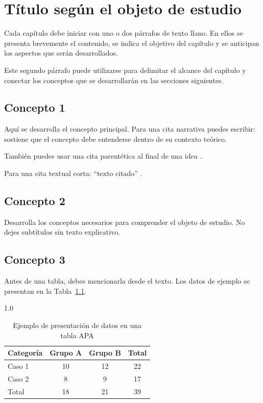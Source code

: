 \chapter{Título según el objeto de estudio}

Cada capítulo debe iniciar con uno o dos párrafos de texto llano. En ellos se presenta brevemente el contenido, se indica el objetivo del capítulo y se anticipan los aspectos que serán desarrollados.

Este segundo párrafo puede utilizarse para delimitar el alcance del capítulo y conectar los conceptos que se desarrollarán en las secciones siguientes.

\section{Concepto 1}

Aquí se desarrolla el concepto principal. Para una cita narrativa puedes escribir: \textcite{ejemplo2020} sostiene que el concepto debe entenderse dentro de su contexto teórico.

También puedes usar una cita parentética al final de una idea \parencite{ejemplo2020}.

Para una cita textual corta: ``texto citado'' \parencite[87]{ejemplo2020}.

\section{Concepto 2}

Desarrolla los conceptos necesarios para comprender el objeto de estudio. No dejes subtítulos sin texto explicativo.

\section{Concepto 3}

Antes de una tabla, debes mencionarla desde el texto. Los datos de ejemplo se presentan en la Tabla~\ref{tab:ejemplo}.

\begin{table}[htbp]
  \caption{Ejemplo de presentación de datos en una tabla APA}
  \label{tab:ejemplo}
  \begin{spacing}{1.0}
  \centering
  \begin{tabular}{lccc}
    \toprule
    Categoría & Grupo A & Grupo B & Total \\
    \midrule
    Caso 1 & 10 & 12 & 22 \\
    Caso 2 & 8  & 9  & 17 \\
    \midrule
    Total  & 18 & 21 & 39 \\
    \bottomrule
  \end{tabular}
  \end{spacing}
\end{table}

